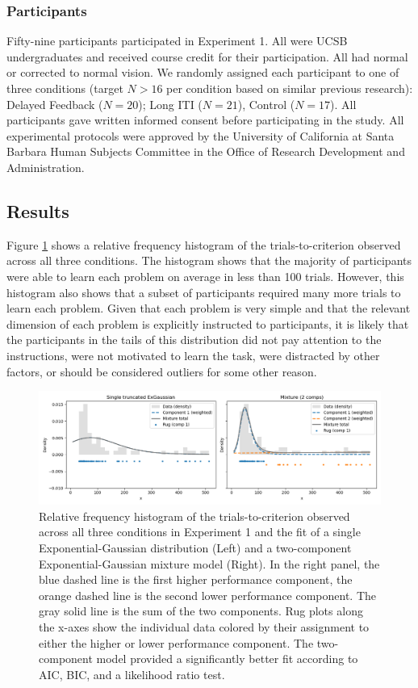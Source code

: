\documentclass[doc, floatsintext]{apa7}
\begin{document}
\subsubsection{Participants}
Fifty-nine participants participated in Experiment 1. All
were UCSB undergraduates and received course credit for
their participation. All had normal or corrected to normal
vision. We randomly assigned each participant to one of
three conditions (target $N>16$ per condition based on
similar previous research): Delayed Feedback ($N = 20$);
Long ITI ($N = 21$), Control ($ N = 17$). All participants
gave written informed consent before participating in the
study. All experimental protocols were approved by the
University of California at Santa Barbara Human Subjects
Committee in the Office of Research Development and
Administration.

\subsection{Results}
Figure \ref{fig_mm_hist_1} shows a relative frequency
histogram of the trials-to-criterion observed across all
three conditions. The histogram shows that the majority of
participants were able to learn each problem on average in
less than 100 trials. However, this histogram also shows
that a subset of participants required many more trials to
learn each problem. Given that each problem is very simple
and that the relevant dimension of each problem is
explicitly instructed to participants, it is likely that the
participants in the tails of this distribution did not pay
attention to the instructions, were not motivated to learn
the task, were distracted by other factors, or should be
considered outliers for some other reason. 

\begin{figure}
  \centering
  \includegraphics[width=.8\textwidth]{../figures/fig_exp_1_mm_trunc_exgauss_compare.png}
  \caption{
      Relative frequency histogram of the
      trials-to-criterion observed across all three
      conditions in Experiment 1 and the fit of a single
      Exponential-Gaussian distribution (Left) and a
      two-component Exponential-Gaussian mixture model
      (Right). In the right panel, the blue dashed line is
      the first higher performance component, the orange
      dashed line is the second lower performance component.
      The gray solid line is the sum of the two components.
      Rug plots along the x-axes show the individual data
      colored by their assignment to either the higher or
      lower performance component.  The two-component model
      provided a significantly better fit according to AIC,
      BIC, and a likelihood ratio test.
}
  \label{fig_mm_hist_1}
\end{figure}
\end{document}
